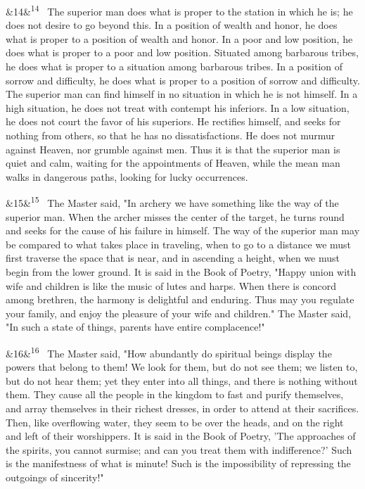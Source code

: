 \documentclass[12pt]{article}
\newcommand{\para}[1][]{\par\noindent\ifx&#1&\else\textsuperscript{\footnotesize #1}~\fi}
\begin{document}
\para[14] The superior man does what is proper to the station in which he is; he does not desire to go beyond this. In a position of wealth and honor, he does what is proper to a position of wealth and honor. In a poor and low position, he does what is proper to a poor and low position. Situated among barbarous tribes, he does what is proper to a situation among barbarous tribes. In a position of sorrow and difficulty, he does what is proper to a position of sorrow and difficulty. The superior man can find himself in no situation in which he is not himself. In a high situation, he does not treat with contempt his inferiors. In a low situation, he does not court the favor of his superiors. He rectifies himself, and seeks for nothing from others, so that he has no dissatisfactions. He does not murmur against Heaven, nor grumble against men. Thus it is that the superior man is quiet and calm, waiting for the appointments of Heaven, while the mean man walks in dangerous paths, looking for lucky occurrences.

\para[15] The Master said, "In archery we have something like the way of the superior man. When the archer misses the center of the target, he turns round and seeks for the cause of his failure in himself. The way of the superior man may be compared to what takes place in traveling, when to go to a distance we must first traverse the space that is near, and in ascending a height, when we must begin from the lower ground. It is said in the Book of Poetry, "Happy union with wife and children is like the music of lutes and harps. When there is concord among brethren, the harmony is delightful and enduring. Thus may you regulate your family, and enjoy the pleasure of your wife and children." The Master said, "In such a state of things, parents have entire complacence!"

\para[16] The Master said, "How abundantly do spiritual beings display the powers that belong to them! We look for them, but do not see them; we listen to, but do not hear them; yet they enter into all things, and there is nothing without them. They cause all the people in the kingdom to fast and purify themselves, and array themselves in their richest dresses, in order to attend at their sacrifices. Then, like overflowing water, they seem to be over the heads, and on the right and left of their worshippers. It is said in the Book of Poetry, 'The approaches of the spirits, you cannot surmise; and can you treat them with indifference?' Such is the manifestness of what is minute! Such is the impossibility of repressing the outgoings of sincerity!"
\end{document}
